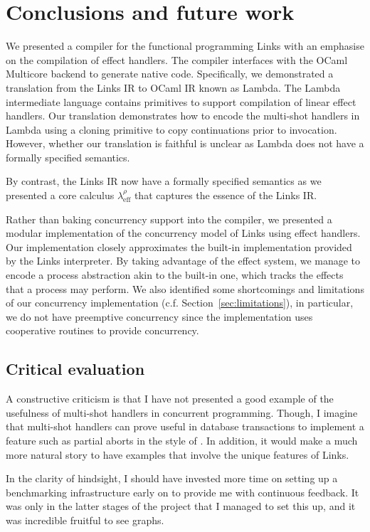 \documentclass[12pt,mscres,cdtppar,twoside,openright,logo,rightchapter,normalheadings]{infthesis}
\theoremstyle{definition}
\newcommand{\Calc}{\ensuremath{\lambda_{\text{eff}}^\rho}\xspace}
\begin{document}
\chapter{Conclusions and future work}
\label{ch:conclusions}

We presented a compiler for the functional programming Links with an
emphasise on the compilation of effect handlers. The compiler
interfaces with the OCaml Multicore backend to generate native
code. Specifically, we demonstrated a translation from the Links IR to
OCaml IR known as Lambda.  The Lambda intermediate language contains
primitives to support compilation of linear effect handlers. Our
translation demonstrates how to encode the multi-shot handlers in
Lambda using a cloning primitive to copy continuations prior to
invocation. However, whether our translation is faithful is unclear as
Lambda does not have a formally specified semantics.

By contrast, the Links IR now have a formally specified semantics as
we presented a core calculus \Calc{} that captures the essence of the
Links IR.

Rather than baking concurrency support into the compiler, we presented
a modular implementation of the concurrency model of Links using
effect handlers. Our implementation closely approximates the built-in
implementation provided by the Links interpreter. By taking advantage
of the effect system, we manage to encode a process abstraction akin
to the built-in one, which tracks the effects that a process may
perform. We also identified some shortcomings and limitations of our
concurrency implementation (c.f. Section~\ref{sec:limitations}), in
particular, we do not have preemptive concurrency since the
implementation uses cooperative routines to provide concurrency.

\section{Critical evaluation}
\label{sec:criticaleval}

A constructive criticism is that I have not presented a good example
of the usefulness of multi-shot handlers in concurrent
programming. Though, I imagine that multi-shot handlers can prove
useful in database transactions to implement a feature such as partial
aborts in the style of \cite{Le2015}. In addition, it would make a
much more natural story to have examples that involve the unique
features of Links.

In the clarity of hindsight, I should have invested more time on
setting up a benchmarking infrastructure early on to provide me with
continuous feedback. It was only in the latter stages of the project
that I managed to set this up, and it was incredible fruitful to see
graphs.
\end{document}
